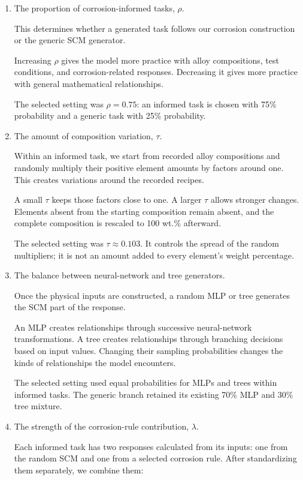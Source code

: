 \documentclass[11pt]{article}
\newenvironment{steps}
  {\begin{enumerate}\setlength{\itemsep}{0.45em}\setlength{\parsep}{0pt}}
  {\end{enumerate}}
\begin{document}
\begin{steps}

    \item[1.] The proportion of corrosion-informed tasks, \(\rho\).

This determines whether a generated task follows our corrosion construction or the generic
SCM generator.

Increasing \(\rho\) gives the model more practice with alloy compositions, test conditions,
and corrosion-related responses. Decreasing it gives more practice with general mathematical
relationships.

The selected setting was \(\rho=0.75\): an informed task is chosen with 75\% probability and
a generic task with 25\% probability.

    \item[2.] The amount of composition variation, \(\tau\).

Within an informed task, we start from recorded alloy compositions and randomly multiply
their positive element amounts by factors around one. This creates variations around the
recorded recipes.

A small \(\tau\) keeps those factors close to one. A larger \(\tau\) allows stronger
changes. Elements absent from the starting composition remain absent, and the complete
composition is rescaled to 100 wt.\% afterward.

The selected setting was \(\tau\approx0.103\). It controls the spread of the random
multipliers; it is not an amount added to every element’s weight percentage.

    \item[3.] The balance between neural-network and tree generators.

Once the physical inputs are constructed, a random MLP or tree generates the SCM part of the
response.

An MLP creates relationships through successive neural-network transformations. A tree
creates relationships through branching decisions based on input values. Changing their
sampling probabilities changes the kinds of relationships the model encounters.

The selected setting used equal probabilities for MLPs and trees within informed tasks. The
generic branch retained its existing 70\% MLP and 30\% tree mixture.

    \item[4.] The strength of the corrosion-rule contribution, \(\lambda\).

Each informed task has two responses calculated from its inputs: one from the random SCM and
one from a selected corrosion rule. After standardizing them separately, we combine them:


\end{steps}
\end{document}
